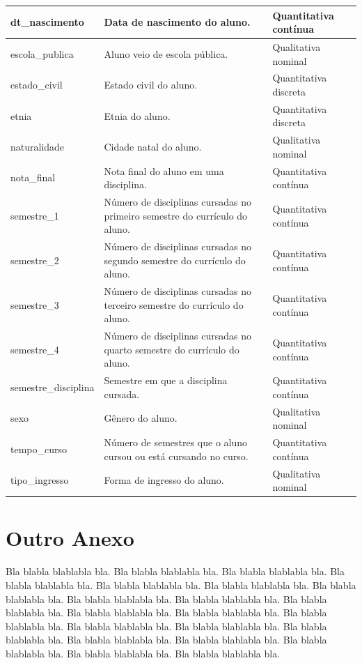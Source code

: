 \documentclass[diss,capa]{texufpel}
\begin{document}
\begin{table}
\begin{center}
\begin{tabular}{p{3cm}|p{8cm}|p{4cm}}
                    dt\_nascimento & Data de nascimento do aluno. & Quantitativa contínua \\ \hline
                    escola\_publica & Aluno veio de escola pública. & Qualitativa nominal \\ \hline
                    estado\_civil & Estado civil do aluno. & Quantitativa discreta \\ \hline
                    etnia & Etnia do aluno. & Quantitativa discreta \\ \hline
                    naturalidade & Cidade natal do aluno. & Qualitativa nominal \\ \hline
                    nota\_final & Nota final do aluno em uma disciplina. & Quantitativa contínua \\ \hline
                    semestre\_1 & Número de disciplinas cursadas no primeiro semestre do currículo do aluno. & Quantitativa contínua \\ \hline
                    semestre\_2 & Número de disciplinas cursadas no segundo semestre do currículo do aluno. & Quantitativa contínua \\ \hline
                    semestre\_3 & Número de disciplinas cursadas no terceiro semestre do currículo do aluno. & Quantitativa contínua \\ \hline
                    semestre\_4 & Número de disciplinas cursadas no quarto semestre do currículo do aluno. & Quantitativa contínua \\ \hline
                    semestre\_disciplina & Semestre em que a disciplina cursada. & Quantitativa contínua \\ \hline
                    sexo & Gênero do aluno. & Qualitativa nominal \\ \hline
                    tempo\_curso & Número de semestres que o aluno cursou ou está cursando no curso. & Quantitativa contínua \\ \hline
                    tipo\_ingresso & Forma de ingresso do aluno. & Qualitativa nominal \\ \hline
                \end{tabular}
            \end{center}
        \end{table}

\chapter{Outro Anexo}

Bla blabla blablabla bla.  Bla blabla blablabla bla.  Bla blabla
blablabla bla.  Bla blabla blablabla bla.  Bla blabla blablabla bla.
Bla blabla blablabla bla.  Bla blabla blablabla bla.  Bla blabla
blablabla bla.  Bla blabla blablabla bla.  Bla blabla blablabla bla.
Bla blabla blablabla bla.  Bla blabla blablabla bla.  Bla blabla
blablabla bla.  Bla blabla blablabla bla.  Bla blabla blablabla bla.
Bla blabla blablabla bla.  Bla blabla blablabla bla.  Bla blabla
blablabla bla.  Bla blabla blablabla bla.  Bla blabla blablabla bla.
Bla blabla blablabla bla.
\end{document}
